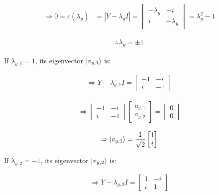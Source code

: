 \begin{align}
  \label{eq:2.11.12}
  \Rightarrow 0 = c(\lambda_y)&=|Y-\lambda_y I|
  =
  \begin{vmatrix}
    -\lambda_y & -i \\
    i & -\lambda_y
  \end{vmatrix}
  =\lambda_y^2-1
\end{align}

\begin{align}
  \label{eq:2.11.13}
  \therefore \lambda_y=\pm 1
\end{align}

If $\lambda_{y,1}=1$, its eigenvector $\ket{v_{y,1}}$ is:

\begin{align}
  \label{eq:2.11.14}
  \Rightarrow Y-\lambda_{y,1} I
  =
  \begin{bmatrix}
    -1 & -i \\
    i & -1
  \end{bmatrix} 
\end{align}

\begin{align}
  \label{eq:2.11.15}
  \Rightarrow
  \begin{bmatrix}
    -1 & -i \\
    i & -1
  \end{bmatrix}
  \begin{bmatrix}
    a_{y,1} \\
    a_{y,2}
  \end{bmatrix}
  =
  \begin{bmatrix}
    0 \\
    0
  \end{bmatrix}
\end{align}

\begin{align}
  \label{eq:2.11.16}
  \Rightarrow \ket{v_{y,1}} = \frac{1}{\sqrt{2}}
  \begin{bmatrix}
    1 \\
    i
  \end{bmatrix} 
\end{align}

If $\lambda_{y,2}=-1$, its eigenvector $\ket{v_{y,2}}$ is:

\begin{align}
  \label{eq:2.11.17}
  \Rightarrow Y-\lambda_{y,2} I
  =
  \begin{bmatrix}
    1 & -i \\
    i & 1
  \end{bmatrix} 
\end{align}

